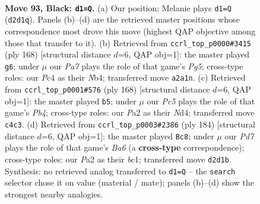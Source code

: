 \documentclass[11pt]{article}
\begin{document}
\clearpage

\begin{figure}[p]\centering
\begin{subfigure}{0.46\textwidth}\centering
\resizebox{\linewidth}{!}{%
\newchessgame
\chessboard[
  setfen={8/8/8/8/2p1k3/6K1/p2p4/8 b - - 1 93},
  showmover=false,
  pgfstyle=straightmove, color=movearrow, markmove={d2-d1}
]}
\caption{}
\end{subfigure}\hfill
\begin{subfigure}{0.46\textwidth}\centering
\resizebox{\linewidth}{!}{%
\newchessgame
\chessboard[
  setfen={8/4n3/4P3/6P1/1N6/4k3/6K1/8 w - - 7 85},
  showmover=false,
  pgfstyle=straightmove, color=movearrow, markmove={g5-g6}
]}
\caption{}
\end{subfigure}
\\[4pt]
\begin{subfigure}{0.46\textwidth}\centering
\resizebox{\linewidth}{!}{%
\newchessgame
\chessboard[
  setfen={8/1k1K4/8/8/1P1N4/8/8/8 w - - 3 85},
  showmover=false,
  pgfstyle=straightmove, color=movearrow, markmove={b4-b5}
]}
\caption{}
\end{subfigure}\hfill
\begin{subfigure}{0.46\textwidth}\centering
\resizebox{\linewidth}{!}{%
\newchessgame
\chessboard[
  setfen={8/8/B4k2/7K/8/5PP1/8/2b5 w - - 77 93},
  showmover=false,
  pgfstyle=straightmove, color=movearrow, markmove={a6-c8}
]}
\caption{}
\end{subfigure}
\caption{\textbf{Move 93, Black: \texttt{d1=Q}.} (a) Our position; Melanie plays \texttt{d1=Q} (\texttt{d2d1q}). Panels (b)--(d) are the retrieved master positions whose correspondence most drove this move (highest QAP objective among those that transfer to it). (b) Retrieved from \texttt{ccrl\_top\_p0000\#3415} (ply 168) [structural distance $d$=6, QAP obj=1]: the master played \texttt{g6}; under $\mu$ our \emph{Pa7} plays the role of that game's \emph{Pg5}; cross-type roles: our \emph{P}c4 as their \emph{N}b4; transferred move \texttt{a2a1n}. (c) Retrieved from \texttt{ccrl\_top\_p0001\#576} (ply 168) [structural distance $d$=6, QAP obj=1]: the master played \texttt{b5}; under $\mu$ our \emph{Pc5} plays the role of that game's \emph{Pb4}; cross-type roles: our \emph{P}a2 as their \emph{N}d4; transferred move \texttt{c4c3}. (d) Retrieved from \texttt{ccrl\_top\_p0003\#2386} (ply 184) [structural distance $d$=6, QAP obj=1]: the master played \texttt{Bc8}; under $\mu$ our \emph{Pd7} plays the role of that game's \emph{Ba6} (a \textbf{cross-type} correspondence); cross-type roles: our \emph{P}a2 as their \emph{b}c1; transferred move \texttt{d2d1b}. Synthesis: no retrieved analog transferred to \texttt{d1=Q} -- the \texttt{search} selector chose it on value (material / mate); panels (b)--(d) show the strongest nearby analogies.}
\label{fig:thought-m185}
\end{figure}
\end{document}
